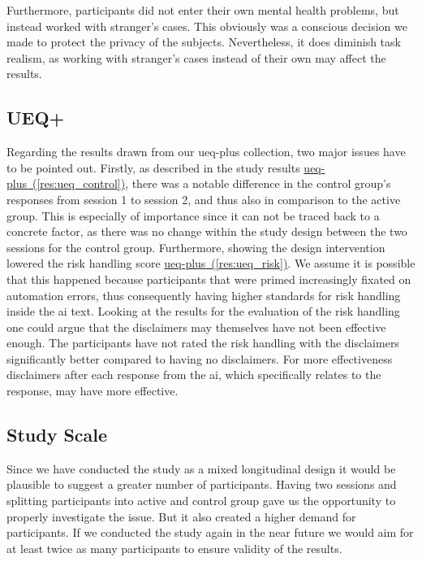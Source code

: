 \documentclass[sigconf,natbib=false]{acmart}
\begin{document}
Furthermore, participants did not enter their own mental health problems, but instead worked with stranger's cases. This obviously was a conscious decision we made to protect the privacy of the subjects. Nevertheless, it does diminish task realism, as working with stranger's cases instead of their own may affect the results. 

\subsection{UEQ+}

Regarding the results drawn from our \Gls{ueq-plus} collection, two major issues have to be pointed out.
Firstly, as described in the study results \hyperref[res:ueq_control]{\gls{ueq-plus}~(\ref*{res:ueq_control})}, there was a notable difference in the control group’s responses from session 1 to session 2, and thus also in comparison to the active group.
This is especially of importance since it can not be traced back to a concrete factor, as there was no change within the study design between the two sessions for the control group.
Furthermore, showing the design intervention lowered the risk handling score \hyperref[res:ueq_risk]{\gls{ueq-plus}~(\ref*{res:ueq_risk})}.
We assume it is possible that this happened because participants that were primed increasingly fixated on automation errors, thus consequently having higher standards for risk handling inside the \Gls{ai} text.
Looking at the results for the evaluation of the risk handling one could argue that the disclaimers may themselves have not been effective enough.
The participants have not rated the risk handling with the disclaimers significantly better compared to having no disclaimers.
For more effectiveness disclaimers after each response from the \Gls{ai}, which specifically relates to the response, may have more effective.

\subsection{Study Scale} 
Since we have conducted the study as a mixed longitudinal design it would be plausible to suggest a greater number of participants. Having two sessions and splitting participants into active and control group gave us the opportunity to properly investigate the issue. But it also created a higher demand for participants. If we conducted the study again in the near future we would aim for at least twice as many participants to ensure validity of the results.
\end{document}

